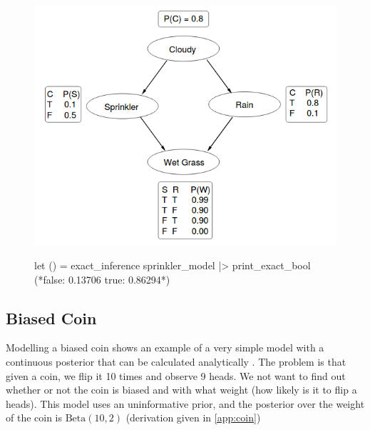 \begin{figure}[!htb]
	\centering
	\begin{minipage}{0.47\linewidth}
		\label{lst:sprinkler}
	\end{minipage}
	\begin{minipage}{0.47\linewidth}
		\includegraphics[width=\linewidth]{figs/sprinkler-network.png}
		\label{fig:sprinkler-network}
		\vspace{0.3cm}
		\begin{ocamlcode-in}
let () =
  exact_inference sprinkler_model
  |> print_exact_bool
(*false: 0.13706 true: 0.86294*)
		\end{ocamlcode-in}
		\label{lst:inf-output}
	\end{minipage}
\end{figure}

\subsection{Biased Coin} \label{sec:coin} 
Modelling a biased coin shows an example of a very simple model with a continuous posterior that can be calculated analytically \cite{datasci}. The problem is that given a coin, we flip it 10 times and observe 9 heads. We not want to find out whether or not the coin is biased and with what weight (how likely is it to flip a heads). This model uses an uninformative prior, and the posterior over the weight of the coin is $\text{Beta}(10,2)$ (derivation given in \ref{app:coin})

